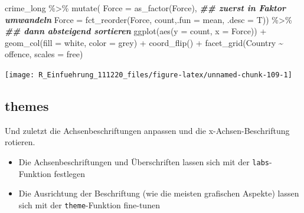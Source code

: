 \documentclass[
]{book}
\newenvironment{Shaded}{\begin{snugshade}}{\end{snugshade}}
\newcommand{\AttributeTok}[1]{\textcolor[rgb]{0.77,0.63,0.00}{#1}}
\newcommand{\DocumentationTok}[1]{\textcolor[rgb]{0.56,0.35,0.01}{\textbf{\textit{#1}}}}
\newcommand{\FunctionTok}[1]{\textcolor[rgb]{0.00,0.00,0.00}{#1}}
\newcommand{\NormalTok}[1]{#1}
\newcommand{\SpecialCharTok}[1]{\textcolor[rgb]{0.00,0.00,0.00}{#1}}
\newcommand{\StringTok}[1]{\textcolor[rgb]{0.31,0.60,0.02}{#1}}
\begin{document}
\begin{Shaded}
\begin{Highlighting}[]
\NormalTok{crime\_long }\SpecialCharTok{\%\textgreater{}\%} 
  \FunctionTok{mutate}\NormalTok{(}
      \AttributeTok{Force =} \FunctionTok{as\_factor}\NormalTok{(Force), }\DocumentationTok{\#\# zuerst in Faktor umwandeln}
      \AttributeTok{Force =} \FunctionTok{fct\_reorder}\NormalTok{(Force, count,}\AttributeTok{.fun =}\NormalTok{ mean, }\AttributeTok{.desc =}\NormalTok{ T)) }\SpecialCharTok{\%\textgreater{}\%} \DocumentationTok{\#\# dann absteigend sortieren}
\FunctionTok{ggplot}\NormalTok{(}\FunctionTok{aes}\NormalTok{(}\AttributeTok{y =}\NormalTok{ count,}
             \AttributeTok{x =}\NormalTok{ Force)) }\SpecialCharTok{+}
  \FunctionTok{geom\_col}\NormalTok{(}\AttributeTok{fill =} \StringTok{\textquotesingle{}white\textquotesingle{}}\NormalTok{,}
           \AttributeTok{color =} \StringTok{\textquotesingle{}grey\textquotesingle{}}\NormalTok{) }\SpecialCharTok{+}
  \FunctionTok{coord\_flip}\NormalTok{() }\SpecialCharTok{+}
  \FunctionTok{facet\_grid}\NormalTok{(Country }\SpecialCharTok{\textasciitilde{}}\NormalTok{ offence, }
             \AttributeTok{scales =} \StringTok{\textquotesingle{}free\textquotesingle{}}\NormalTok{)}
\end{Highlighting}
\end{Shaded}

\begin{center}\texttt{[image: R\_Einfuehrung\_111220\_files/figure-latex/unnamed-chunk-109-1]} \end{center}

\hypertarget{themes}{%
\subsection{themes}\label{themes}}

Und zuletzt die Achsenbeschriftungen anpassen und die x-Achsen-Beschriftung rotieren.

\begin{itemize}
\item
  Die Achsenbeschriftungen und Überschriften lassen sich mit der \texttt{labs}-Funktion festlegen
\item
  Die Ausrichtung der Beschriftung (wie die meisten grafischen Aspekte) lassen sich mit der \texttt{theme}-Funktion fine-tunen
\end{itemize}
\end{document}
